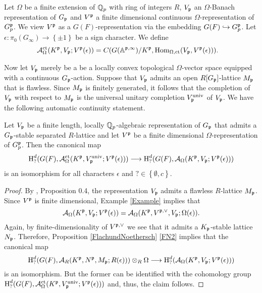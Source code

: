 Let $\Omega$ be a finite extension of $\mathbb{Q}_p$ with ring of integers $R$, $V_{\mathfrak{p}}$ an $\Omega$-Banach representation of $G_{\mathfrak{p}}$ and $V^{\mathfrak{p}}$ a finite dimensional continuous $\Omega$-representation of $G_p^{\mathfrak{p}}$.
We view $V^{\mathfrak{p}}$ as a $G(F)$-representation via the embedding $G(F)\hookrightarrow G_p^{\mathfrak{p}}$.
Let $\epsilon\colon \pi_0(G_\infty)\to \left\{\pm 1\right\}$ be a sign character.
We define
\begin{align*}
\mathcal{A}_\Omega^{\operatorname{ct}}(K^{\mathfrak{p}},V_{\mathfrak{p}};V^{\mathfrak{p}}(\epsilon))&=C(G(\mathbb{A}^{\mathfrak{p},\infty})/K^{\mathfrak{p}},\operatorname{Hom}_{\Omega,\operatorname{ct}}(V_{\mathfrak{p}},V^{\mathfrak{p}}(\epsilon))).
\end{align*}

Now let $V_{\mathfrak{p}}$ merely be a be a locally convex topological $\Omega$-vector space equipped with a continuous $G_{\mathfrak{p}}$-action.
Suppose that $V_{\mathfrak{p}}$ admits an open $R[G_{\mathfrak{p}}]$-lattice $M_{\mathfrak{p}}$ that is flawless.
Since $M_{\mathfrak{p}}$ is finitely generated, it follows that the completion of $V_{\mathfrak{p}}$ with respect to $M_{\mathfrak{p}}$ is the universal unitary completion $V_{\mathfrak{p}}^{\operatorname{univ}}$ of $V_{\mathfrak{p}}$.
We have the following automatic continuity statement.
\begin{Cor}\label{automatic}
Let $V_{\mathfrak{p}}$ be a finite length, locally $\mathbb{Q}_p$-algebraic representation of $G_{\mathfrak{p}}$ that admits a $G_{\mathfrak{p}}$-stable separated $R$-lattice and let $V^{\mathfrak{p}}$ be a finite dimensional $\Omega$-representation of $G_p^{\mathfrak{p}}$.
Then the canonical map
$$\operatorname{H}^{d}_?(G(F),\mathcal{A}_{\Omega}^{\operatorname{ct}}(K^{\mathfrak{p}},V_{\mathfrak{p}}^{\operatorname{univ}};V^{\mathfrak{p}}(\epsilon)))\longrightarrow \operatorname{H}^{d}_?(G(F),\mathcal{A}_{\Omega}(K^{\mathfrak{p}},V_{\mathfrak{p}};V^{\mathfrak{p}}(\epsilon)))$$
is an isomorphism for all characters $\epsilon$ and $?\in\left\{\emptyset,c\right\}$.
\end{Cor}
\begin{proof}
By \cite{Vi}, Proposition 0.4, the representation $V_{\mathfrak{p}}$ admits a flawless $R$-lattice $M_{\mathfrak{p}}$. 
Since $V^{\mathfrak{p}}$ is finite dimensional, Example \ref{Example} implies that
$$\mathcal{A}_{\Omega}(K^{\mathfrak{p}},V_{\mathfrak{p}};V^{\mathfrak{p}}(\epsilon))=\mathcal{A}_{\Omega}(K^{\mathfrak{p}},V^{\mathfrak{p},\vee},V_{\mathfrak{p}};\Omega(\epsilon)).$$
Again, by finite-dimensionality of $V^{\mathfrak{p},\vee}$ we see that it admits a $K_{\mathfrak{p}}$-stable lattice $N_{\mathfrak{p}}$.
Therefore, Proposition \ref{FlachundNoethersch} \eqref{FN2} implies that the canonical map
$$\operatorname{H}^{d}_?(G(F),\mathcal{A}_{R}(K^{\mathfrak{p}},N^{\mathfrak{p}},M_{\mathfrak{p}};R(\epsilon)))\otimes_R \Omega\longrightarrow \operatorname{H}^{d}_?(\mathcal{A}_{\Omega}(K^{\mathfrak{p}},V_{\mathfrak{p}};V^{\mathfrak{p}}(\epsilon)))$$
is an isomorphism.
But the former can be identified with the cohomology group $\operatorname{H}^{d}_?(G(F),\mathcal{A}_{\Omega}^{\operatorname{ct}}(K^{\mathfrak{p}},V_{\mathfrak{p}}^{\operatorname{univ}};V^{\mathfrak{p}}(\epsilon)))$
and, thus, the claim follows.
\end{proof}


